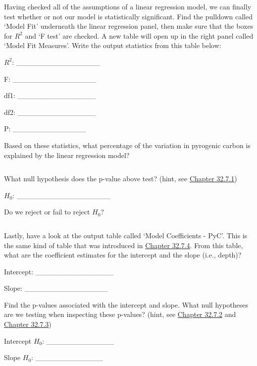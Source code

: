 \documentclass[
  openany]{scrbook}
\begin{document}
Having checked all of the assumptions of a linear regression model, we can finally test whether or not our model is statistically significant.
Find the pulldown called `Model Fit' underneath the linear regression panel, then make sure that the boxes for \(R^{2}\) and `F test' are checked.
A new table will open up in the right panel called `Model Fit Measures'.
Write the output statistics from this table below:

\(R^{2}\): \_\_\_\_\_\_\_\_\_\_\_\_\_\_\_\_

F: \_\_\_\_\_\_\_\_\_\_\_\_\_\_\_\_

df1: \_\_\_\_\_\_\_\_\_\_\_\_\_\_\_

df2: \_\_\_\_\_\_\_\_\_\_\_\_\_\_\_

P: \_\_\_\_\_\_\_\_\_\_\_\_\_\_

Based on these statistics, what percentage of the variation in pyrogenic carbon is explained by the linear regression model?

\begin{verbatim}
\end{verbatim}

What null hypothesis does the p-value above test? (hint, see \protect\hyperlink{overall-model-significance}{Chapter 32.7.1})

\(H_{0}\): \_\_\_\_\_\_\_\_\_\_\_\_\_\_\_\_\_\_

Do we reject or fail to reject \(H_{0}\)?

\begin{verbatim}
\end{verbatim}

Lastly, have a look at the output table called `Model Coefficients - PyC'.
This is the same kind of table that was introduced in \protect\hyperlink{simple-regression-output}{Chapter 32.7.4}.
From this table, what are the coefficient estimates for the intercept and the slope (i.e., depth)?

Intercept: \_\_\_\_\_\_\_\_\_\_\_\_\_\_\_

Slope: \_\_\_\_\_\_\_\_\_\_\_\_\_\_\_\_

Find the p-values associated with the intercept and slope.
What null hypotheses are we testing when inspecting these p-values? (hint, see \protect\hyperlink{significance-of-the-intercept}{Chapter 32.7.2} and \protect\hyperlink{significance-of-the-slope}{Chapter 32.7.3})

Intercept \(H_{0}\): \_\_\_\_\_\_\_\_\_\_\_\_\_

Slope \(H_{0}\): \_\_\_\_\_\_\_\_\_\_\_\_\_
\end{document}
